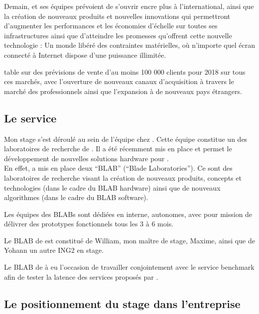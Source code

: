 
Demain, \B et ses équipes prévoient de s'ouvrir encre plus à
l'international, ainsi que la création de nouveaux produits et nouvelles
innovations qui permettront d'augmenter les performances et les économies
d'échelle sur toutes ses infrastructures ainsi que d'atteindre les promesses
qu'offrent cette nouvelle technologie : Un monde libéré des contraintes
matérielles, où n'importe quel écran connecté à
Internet dispose d'une puissance illimitée.

\B table sur des prévisions de vente d'au moins 100 000 clients pour 2018
sur tous ces marchés, avec l'ouverture de nouveaux canaux d'acquisition à
travers le marché des professionnels ainsi que l'expansion à de nouveaux pays
étrangers.



\newpage


\subsection{Le service}

Mon stage s'est déroulé au sein de l'équipe \rd chez \s. Cette équipe constitue
un des laboratoires de recherche de \s. Il a été récemment mis en place et
permet le développement de nouvelles solutions hardware pour \s.\\

En effet, \B a mis en place deux ``BLAB'' (``Blade Laboratories''). Ce sont des
laboratoires de recherche visant la création de nouveaux produits, concepts et
technologies (dans le cadre du BLAB hardware) ainsi que de nouveaux algorithmes
(dans le cadre du BLAB software).

Les équipes des BLABs sont dédiées en interne, autonomes, avec pour mission de
délivrer des prototypes fonctionnels tous les 3 à 6 mois.



Le BLAB de \rd est constitué de William, mon maître de stage, Maxime, ainsi que
de Yohann un autre ING2 en stage.

Le BLAB de \rd à eu l'occasion de travailler conjointement avec le service
benchmark afin de tester la latence des services proposés par \B.

\newpage

\subsection{Le positionnement du stage dans l’entreprise}

